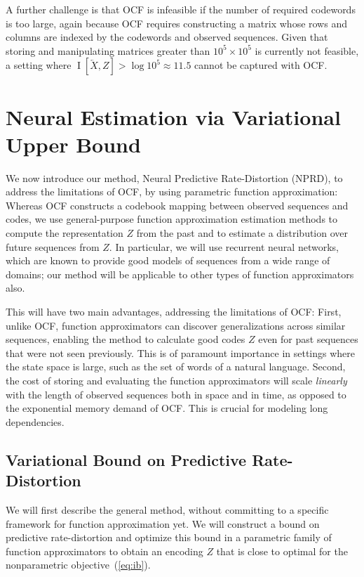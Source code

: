\documentclass[entropy,article,submit,moreauthors,pdftex,10pt,a4paper]{Definitions/mdpi}
\newcommand{\past}{\overleftarrow{X}}
\begin{document}
A further challenge is that OCF is infeasible if the number of required codewords is too large, again because OCF requires constructing a matrix whose rows and columns are indexed by the codewords and observed sequences.
Given that storing and manipulating matrices greater than $10^5 \times 10^5$ is currently not feasible, a setting where $\operatorname{I}[\past, Z] > \log 10^5 \approx 11.5$ cannot be captured with OCF.

\section{Neural Estimation via Variational Upper Bound}\label{sec:nprd}

We now introduce our method, Neural Predictive Rate-Distortion (NPRD), to address the limitations of OCF, by using parametric function approximation:
Whereas OCF constructs a codebook mapping between observed sequences and codes, we use general-purpose function approximation estimation methods to compute the representation $Z$ from the past and to estimate a distribution over future sequences from $Z$.
In particular, we will use recurrent neural networks, which are known to provide good models of sequences from a wide range of domains; our method will be applicable to other types of function approximators also.

This will have two main advantages, addressing the limitations of OCF:
First, unlike OCF, function approximators can discover generalizations across similar sequences, enabling the method to calculate good codes $Z$ even for past sequences that were not seen previously.
This is of paramount importance in settings where the state space is large, such as the set of words of a natural language.
Second, the cost of storing and evaluating the function approximators will scale \emph{linearly} with the length of observed sequences both in space and in time, as opposed to the exponential memory demand of OCF.
This is crucial for modeling long dependencies.

\subsection{Variational Bound on Predictive Rate-Distortion}
We will first describe the general method, without committing to a specific framework for function approximation yet.
We will construct a bound on predictive rate-distortion and optimize this bound in a parametric family of function approximators to obtain an encoding $Z$ that is close to optimal for the nonparametric objective~(\ref{eq:ib}).
\end{document}
